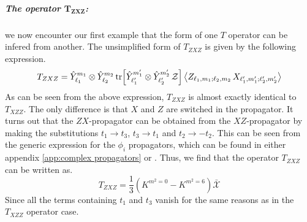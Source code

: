 \subparagraph[The operator $T_{ZXZ}$]{The operator $\mathbf{T_{ZXZ}}$:} we now encounter our first example that the form of one $T$ operator can be infered from another. The unsimplified form of $T_{ZXZ}$ is given by the following expression.
%
%
\begin{equation}
T_{ZXZ} = \hat{Y}_{\ell_1}^{m_1} \otimes \hat{Y}_{\ell_2}^{m_2}
\tr[\hat{Y}_{\ell_1'}^{m_1'} \otimes \hat{Y}_{\ell_2'}^{m_2'} \, \mathcal{Z}]
\expval{Z_{\ell_1, m_1; \ell_2, m_2} \, X_{\ell_1', m_1'; \ell_2', m_2'}}
\end{equation}
%
%
As can be seen from the above expression, $T_{ZXZ}$ is almost exactly identical to $T_{XZZ}$. The only difference is that $X$ and $Z$ are switched in the propagator. It turns out that the $ZX$-propagator can be obtained from the $XZ$-propagator by making the substitutions $t_1 \to t_3$, $t_3 \to t_1$ and $t_2 \to - t_2$. This can be seen from the generic expression for the $\phi_i$ propagators, which can be found in either appendix \ref{app:complex propagators} or \cite{One-point functions in D3-D7}. Thus, we find that the operator $T_{ZXZ}$ can be written as.
%
%
\begin{equation}
T_{ZXZ} = \frac{1}{3} \left(
K^{m^2=0} - K^{m^2=6}
\right)
\bar{\mathcal{X}}
\end{equation}
%
%
Since all the terms containing $t_1$ and $t_3$ vanish for the same reasons as in the $T_{XZZ}$ operator case.

